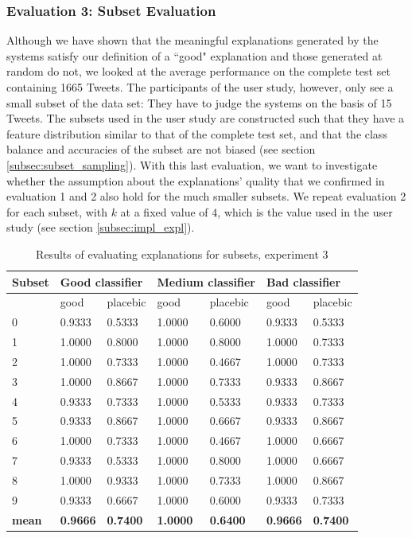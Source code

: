 \subsubsection{Evaluation 3: Subset Evaluation}
Although we have shown that the meaningful explanations generated by the systems satisfy our definition of a ``good" explanation and those generated at random do not, we looked at the average performance on the complete test set containing 1665 Tweets. The participants of the user study, however, only see a small subset of the data set: They have to judge the systems on the basis of 15 Tweets. The subsets used in the user study are constructed such that they have a feature distribution similar to that of the complete test set, and that the class balance and accuracies of the subset are not biased (see section \ref{subsec:subset_sampling}). With this last evaluation, we want to investigate whether the assumption about the explanations' quality that we  confirmed in evaluation 1 and 2 also hold for the much smaller subsets. We repeat evaluation 2 for each subset, with $k$ at a fixed value of $4$, which is the value used in the user study (see section \ref{subsec:impl_expl}).\newline
\begin{table}[H]
	\centering
	\begin{tabular}{l|m{1.4cm}m{1.4cm}|m{1.4cm}m{1.4cm}|m{1.4cm}m{1.4cm}}
		\textbf{Subset} & \multicolumn{2}{l|}{\textbf{Good classifier}} & \multicolumn{2}{l|}{\textbf{Medium classifier}} & \multicolumn{2}{l}{\textbf{Bad classifier}} \\ \midrule
		& good & placebic & good & placebic & good & placebic \\ \midrule
		0 & 0.9333 & 0.5333 & 1.0000 & 0.6000 & 0.9333 & 0.5333 \\
		1 & 1.0000 & 0.8000 & 1.0000 & 0.8000 & 1.0000 & 0.7333 \\
		2 & 1.0000 & 0.7333 & 1.0000 & 0.4667 & 1.0000 & 0.7333 \\
		3 & 1.0000 & 0.8667 & 1.0000 & 0.7333 & 0.9333 & 0.8667 \\
		4 & 0.9333 & 0.7333 & 1.0000 & 0.5333 & 0.9333 & 0.7333 \\
		5 & 0.9333 & 0.8667 & 1.0000 & 0.6667 & 0.9333 & 0.8667 \\
		6 & 1.0000 & 0.7333 & 1.0000 & 0.4667 & 1.0000 & 0.6667 \\
		7 & 0.9333 & 0.5333 & 1.0000 & 0.8000 & 1.0000 & 0.6667 \\
		8 & 1.0000 & 0.9333 & 1.0000 & 0.7333 & 1.0000 & 0.8667 \\
		9 & 0.9333 & 0.6667 & 1.0000 & 0.6000 & 0.9333 & 0.7333 \\ \midrule
		\textbf{mean} & \textbf{0.9666} & \textbf{0.7400} & \textbf{1.0000} & \textbf{0.6400} & \textbf{0.9666} & \textbf{0.7400}  \\ \bottomrule
	\end{tabular}
	\caption{Results of evaluating explanations for subsets, experiment 3}
	\label{tab:exp3}
\end{table}
